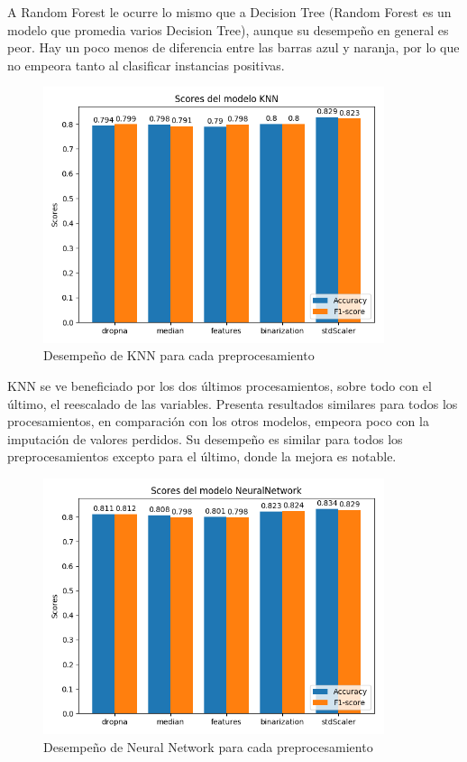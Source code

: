 \documentclass[oneside]{book}
\begin{document}
A Random Forest le ocurre lo mismo que a Decision Tree (Random Forest
es un modelo que promedia varios Decision Tree), aunque su desempeño
en general es peor. Hay un poco menos de diferencia entre las barras
azul y naranja, por lo que no empeora tanto al clasificar instancias
positivas.

\begin{figure}[H]
  \centering
  \caption{Desempeño de KNN para cada preprocesamiento}
  \label{fig:knn}
  \includegraphics[width=100mm]{figures/visualizacion/knn}
\end{figure}

KNN se ve beneficiado por los dos últimos procesamientos, sobre todo
con el último, el reescalado de las variables. Presenta resultados
similares para todos los procesamientos, en comparación con los otros
modelos, empeora poco con la imputación de valores perdidos. Su
desempeño es similar para todos los preprocesamientos excepto para el
último, donde la mejora es notable.

\begin{figure}[H]
  \centering
  \caption{Desempeño de Neural Network para cada preprocesamiento}
  \label{fig:neuralNetwork}
  \includegraphics[width=100mm]{figures/visualizacion/neuralNetwork}
\end{figure}
\end{document}
